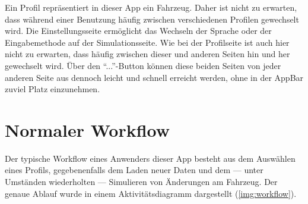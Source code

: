     Ein Profil repräsentiert in dieser App ein Fahrzeug. Daher ist nicht zu erwarten, dass während einer Benutzung häufig zwischen verschiedenen Profilen gewechselt wird.
    Die Einstellungsseite ermöglicht das Wechseln der Sprache oder der Eingabemethode auf der Simulationsseite. Wie bei der Profilseite ist auch hier nicht zu erwarten, dass häufig zwischen dieser und anderen Seiten hin und her gewechselt wird. Über den ``...''-Button können diese beiden Seiten von jeder anderen Seite aus dennoch leicht und schnell erreicht werden, ohne in der AppBar zuviel Platz einzunehmen.
    
    \section{Normaler Workflow}
    \label{sec:workflow}
    
    Der typische Workflow eines Anwenders dieser App besteht aus dem Auswählen eines Profils, gegebenenfalls dem Laden neuer Daten und dem --- unter Umständen wiederholten --- Simulieren von Änderungen am Fahrzeug. Der genaue Ablauf wurde in einem Aktivitätsdiagramm dargestellt (\cref{img:workflow}).
    
